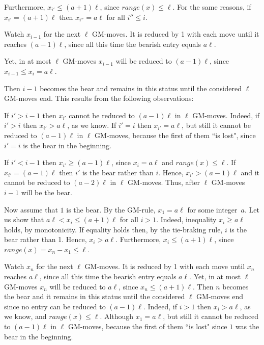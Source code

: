 \documentclass[10pt]{article}
\theoremstyle{definition}
\begin{document}
Furthermore, $x_{i'} \leq (a+1) \ell$, 
since $range(x) \leq \ell$. 
For the same reasons, if  $x_{i'} = (a+1) \ell$ then  
$x_{i''} = a \ell$  for all $i'' \leq i$.   

Watch  $x_{i-1}$  for the next $\ell$  GM-moves. 
It is reduced by 1 with each move 
until it reaches $(a-1) \ell$, 
since all this time the bearish entry equals $a \ell$. 

Yet, in at most  $\ell$  GM-moves  
$x_{i-1}$  will be reduced to $(a-1) \ell$, 
since $x_{i-1} \leq x_i = a \ell$.  

Then $i-1$ becomes the bear and 
remains in this status 
until the considered  $\ell$  GM-moves end. 
This results from the following observations:    

If  $i' > i-1$  then $x_{i'}$  
cannot be reduced to $(a-1) \ell$ in $\ell$ GM-moves. 
Indeed, if  $i' > i$  then  $x_{i'} > a \ell$, as we know. 
If  $i' = i$  then  $x_{i'} = a \ell$, 
but still it cannot be reduced to $(a-1) \ell$
in $\ell$  GM-moves, 
because the first of them ``is lost", 
since  $i' = i$ is the bear in the beginning. 

If  $i' < i - 1$  then $x_{i'} \geq (a-1) \ell$, 
since $x_i = a \ell$ and  $range(x) \leq \ell$. 
If  $x_{i'} = (a-1) \ell$ 
then $i'$  is the bear rather than $i$. 
Hence,  $x_{i'} > (a-1) \ell$  and 
it cannot be reduced to 
$(a-2) \ell$  in $\ell$ GM-moves. 
Thus, after $\ell$  GM-moves $i-1$  will be the bear. 

\medskip 

Now assume that  $1$  is the bear. 
By the GM-rule,  $x_1 = a \ell$  for some integer~$a$.
Let us show that $a \ell < x_i \leq (a+1) \ell$ 
for all $i > 1$.
Indeed, inequality $x_i \geq a \ell$ holds, by monotonicity. 
If equality holds then, by the tie-braking rule, 
$i$  is the bear rather than 1. 
Hence, $x_i > a \ell$. 
Furthermore, $x_i \leq (a+1) \ell$, 
since $range(x) = x_n - x_1  \leq \ell$. 

Watch $x_n$ for the next $\ell$  GM-moves.
It is reduced by 1 with each move  
until $x_n$  reaches $a \ell$, 
since  all this time 
the bearish entry equals $a \ell$.  
Yet, in at most  $\ell$  GM-moves  
$x_n$  will be reduced to $a \ell$, 
since $x_n \leq (a+1) \ell$.  
Then $n$ becomes the bear and 
it remains in this status 
until the considered  $\ell$  GM-moves end 
since no entry can be reduced to $(a-1) \ell$.
Indeed, if  $i > 1$  then  $x_i > a \ell$, as we know, 
and $range(x) \leq \ell$.  
Although  $x_1 = a \ell$, 
but still it cannot be reduced to $(a-1) \ell$
in $\ell$  GM-moves, 
because the first of them ``is lost" 
since  $1$ was the bear in the beginning. 
\end{document}
